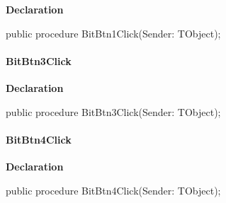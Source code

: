 \documentclass{report}
\newif\ifpdf
\begin{document}
\label{manager.TMnFrm-BitBtn1Click}
\begin{list}{}{
\setlength{\itemindent}{0cm}
\setlength{\listparindent}{0cm}
\setlength{\leftmargin}{\evensidemargin}
\addtolength{\leftmargin}{\tmplength}
\settowidth{\labelsep}{X}
\addtolength{\leftmargin}{\labelsep}
\setlength{\labelwidth}{\tmplength}
}
\item[\textbf{Declaration}\hfill]
\ifpdf
\begin{flushleft}
\fi
\begin{ttfamily}
public procedure BitBtn1Click(Sender: TObject);\end{ttfamily}

\ifpdf
\end{flushleft}
\fi

\end{list}
\paragraph*{BitBtn3Click}\hspace*{\fill}

\label{manager.TMnFrm-BitBtn3Click}
\begin{list}{}{
\setlength{\itemindent}{0cm}
\setlength{\listparindent}{0cm}
\setlength{\leftmargin}{\evensidemargin}
\addtolength{\leftmargin}{\tmplength}
\settowidth{\labelsep}{X}
\addtolength{\leftmargin}{\labelsep}
\setlength{\labelwidth}{\tmplength}
}
\item[\textbf{Declaration}\hfill]
\ifpdf
\begin{flushleft}
\fi
\begin{ttfamily}
public procedure BitBtn3Click(Sender: TObject);\end{ttfamily}

\ifpdf
\end{flushleft}
\fi

\end{list}
\paragraph*{BitBtn4Click}\hspace*{\fill}

\label{manager.TMnFrm-BitBtn4Click}
\begin{list}{}{
\setlength{\itemindent}{0cm}
\setlength{\listparindent}{0cm}
\setlength{\leftmargin}{\evensidemargin}
\addtolength{\leftmargin}{\tmplength}
\settowidth{\labelsep}{X}
\addtolength{\leftmargin}{\labelsep}
\setlength{\labelwidth}{\tmplength}
}
\item[\textbf{Declaration}\hfill]
\ifpdf
\begin{flushleft}
\fi
\begin{ttfamily}
public procedure BitBtn4Click(Sender: TObject);\end{ttfamily}

\ifpdf
\end{flushleft}
\fi

\end{list}
\end{document}
